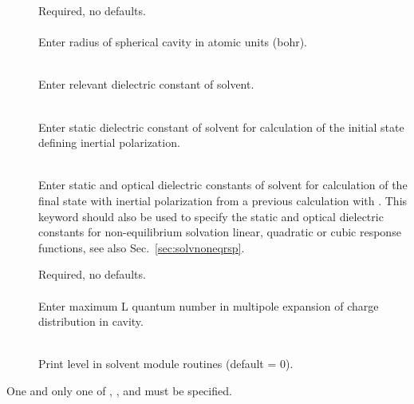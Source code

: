 \begin{description}
\item[]
  Required, no defaults.\\
  \\
  Enter radius of spherical cavity in atomic units (bohr).

\item[]
  \\
  Enter relevant dielectric constant of solvent.

\item[]
  \\
  Enter static dielectric constant of solvent for calculation
  of the initial state defining inertial polarization.

\item[]
  \\
  Enter static and optical dielectric constants of solvent
  for calculation of the final state with inertial polarization
  from a previous calculation with . 
  This keyword should also be used to specify the
  static and optical dielectric constants for non-equilibrium
  solvation linear, quadratic or cubic response functions, see also Sec.~\ref{sec:solvnoneqrsp}.

\item[]
  Required, no defaults.\\
  \\
  Enter maximum L quantum number in multipole expansion of charge
  distribution in cavity.

\item[]
   \\
  Print level in solvent module routines (default = 0).
\end{description}


One and only one of ,
, and  must be
specified.



\pagebreak[3]
\subsection{\label{ref-stpinp}}

